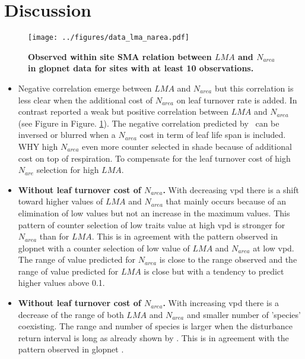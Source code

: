 \documentclass[a4paper,11pt]{article}
\begin{document}
\clearpage

\section{Discussion}


\begin{figure}[ht]
\centering
\texttt{[image: ../figures/data\_lma\_narea.pdf]}
\caption{\textbf{Observed within site SMA relation between $LMA$ and
    $N_{area}$ in glopnet data \citep{Wright-2004} for sites with at
    least 10 observations.}
\label{fig:lma_narea_glopnet}}
\end{figure}

\begin{itemize}

\item Negative correlation emerge between $LMA$ and $N_{area}$ but
  this correlation is less clear when the additional cost of $N_{area}$
  on leaf turnover rate is added. In contrast \citet{Wright-2004}
  reported a weak but positive correlation between $LMA$ and
  $N_{area}$ (see Figure in Figure. \ref{fig:lma_narea_glopnet}). The
  negative correlation predicted by \plant\ can be inversed or
 blurred when a $N_{area}$ cost in term of leaf life span is
 included. WHY high $N_{area}$ even more counter selected in shade
 because of additional cost on top of respiration. To compensate for
 the leaf turnover cost of high $N_{are}$ selection for high $LMA$.
  
\item \textbf{Without leaf turnover cost of $N_{area}$.} With
  decreasing vpd there is a shift toward higher values of $LMA$ and
  $N_{area}$ that mainly occurs because of an elimination of low
  values but not an increase in the maximum values. This pattern of
  counter selection of low traits value at high vpd is stronger for
  $N_{area}$ than for $LMA$. This is in agreement with the pattern
  observed in glopnet \citep{Wright-2004} with a counter selection of
  low value of $LMA$ and $N_{area}$ at low vpd. The range of value
  predicted for $N_{area}$ is close to the range observed and the
  range of value predicted for $LMA$ is close but with a tendency to
  predict higher values above 0.1.  

\item \textbf{Without leaf turnover cost of $N_{area}$.} With
  increasing vpd there is a decrease of the range of both $LMA$ and
  $N_{area}$ and smaller number of 'species' coexisting. The range and
  number of species is larger when the disturbance return interval is
  long as already shown by \citet{Falster-2017}. This is in agreement with the pattern observed in glopnet \citep{Wright-2004}.


\end{itemize}
\end{document}
